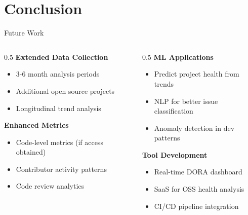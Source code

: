 \documentclass[aspectratio=169]{beamer}
\begin{document}
\section{Conclusion}

\begin{frame}{Future Work}
  \begin{columns}
    \begin{column}{0.5\textwidth}
      \textbf{Extended Data Collection}
      \begin{itemize}
        \item 3-6 month analysis periods
        \item Additional open source projects
        \item Longitudinal trend analysis
      \end{itemize}

      \vspace{0.3cm}
      \textbf{Enhanced Metrics}
      \begin{itemize}
        \item Code-level metrics (if access obtained)
        \item Contributor activity patterns
        \item Code review analytics
      \end{itemize}
    \end{column}

    \begin{column}{0.5\textwidth}
      \textbf{ML Applications}
      \begin{itemize}
        \item Predict project health from trends
        \item NLP for better issue classification
        \item Anomaly detection in dev patterns
      \end{itemize}

      \vspace{0.3cm}
      \textbf{Tool Development}
      \begin{itemize}
        \item Real-time DORA dashboard
        \item SaaS for OSS health analysis
        \item CI/CD pipeline integration
      \end{itemize}
    \end{column}
  \end{columns}
\end{frame}
\end{document}
